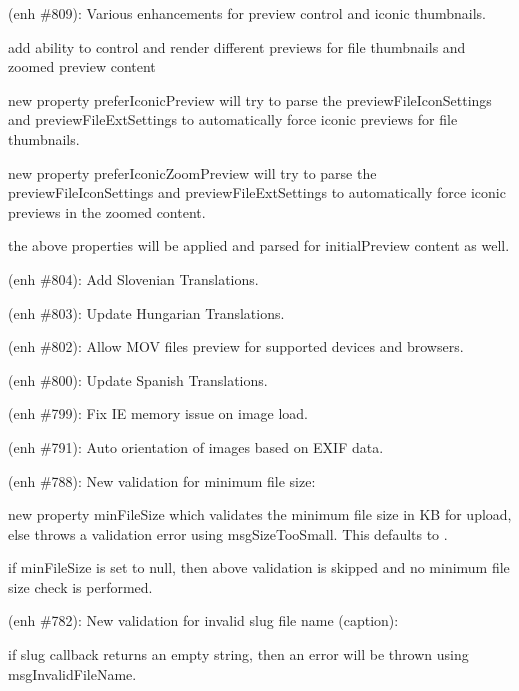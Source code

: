 \begin{DoxyItemize}
\item (enh \#809)\+: Various enhancements for preview control and iconic thumbnails.
\begin{DoxyItemize}
\item add ability to control and render different previews for file thumbnails and zoomed preview content
\item new property {\ttfamily prefer\+Iconic\+Preview} will try to parse the {\ttfamily preview\+File\+Icon\+Settings} and {\ttfamily preview\+File\+Ext\+Settings} to automatically force iconic previews for file thumbnails.
\item new property {\ttfamily prefer\+Iconic\+Zoom\+Preview} will try to parse the {\ttfamily preview\+File\+Icon\+Settings} and {\ttfamily preview\+File\+Ext\+Settings} to automatically force iconic previews in the zoomed content.
\item the above properties will be applied and parsed for {\ttfamily initial\+Preview} content as well.
\end{DoxyItemize}
\item (enh \#804)\+: Add Slovenian Translations.
\item (enh \#803)\+: Update Hungarian Translations.
\item (enh \#802)\+: Allow M\+OV files preview for supported devices and browsers.
\item (enh \#800)\+: Update Spanish Translations.
\item (enh \#799)\+: Fix IE memory issue on image load.
\item (enh \#791)\+: Auto orientation of images based on E\+X\+IF data.
\item (enh \#788)\+: New validation for minimum file size\+:
\begin{DoxyItemize}
\item new property {\ttfamily min\+File\+Size} which validates the minimum file size in KB for upload, else throws a validation error using {\ttfamily msg\+Size\+Too\+Small}. This defaults to {}.
\item if {\ttfamily min\+File\+Size} is set to {\ttfamily null}, then above validation is skipped and no minimum file size check is performed.
\end{DoxyItemize}
\item (enh \#782)\+: New validation for invalid slug file name (caption)\+:
\begin{DoxyItemize}
\item if slug callback returns an empty string, then an error will be thrown using {\ttfamily msg\+Invalid\+File\+Name}.

\end{DoxyItemize}
\end{DoxyItemize}
